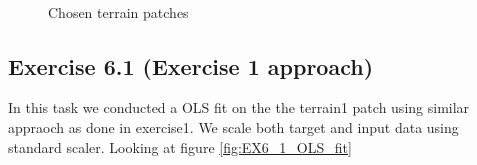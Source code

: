 \documentclass[11pt, a4paper]{article}
\begin{document}
\begin{figure}
  \centering
  \\
  \caption{Chosen terrain patches}%
  \label{fig:terrain_patches_focus}%
\end{figure}


\subsection*{Exercise 6.1 (Exercise 1 approach)}
In this task we conducted a OLS fit on the the terrain1 patch using similar appraoch as done in exercise1.
We scale both target and input data using standard scaler. Looking at figure \ref{fig:EX6_1_OLS_fit} 
\end{document}
